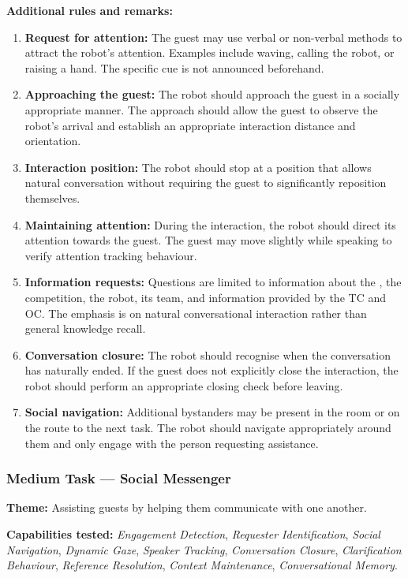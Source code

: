 \medskip
\noindent \textbf{Additional rules and remarks:}
\begin{enumerate}[nosep]
	\item \textbf{Request for attention:} The guest may use verbal or non-verbal methods to attract the robot's attention. Examples include waving, calling the robot, or raising a hand. The specific cue is not announced beforehand.
	\item \textbf{Approaching the guest:} The robot should approach the guest in a socially appropriate manner. The approach should allow the guest to observe the robot's arrival and establish an appropriate interaction distance and orientation.
	\item \textbf{Interaction position:} The robot should stop at a position that allows natural conversation without requiring the guest to significantly reposition themselves.
	\item \textbf{Maintaining attention:} During the interaction, the robot should direct its attention towards the guest. The guest may move slightly while speaking to verify attention tracking behaviour.
	\item \textbf{Information requests:} Questions are limited to information about the \Arena{}, the competition, the robot, its team, and information provided by the TC and OC. The emphasis is on natural conversational interaction rather than general knowledge recall.
	\item \textbf{Conversation closure:} The robot should recognise when the conversation has naturally ended. If the guest does not explicitly close the interaction, the robot should perform an appropriate closing check before leaving.
	\item \textbf{Social navigation:} Additional bystanders may be present in the room or on the route to the next task. The robot should navigate appropriately around them and only engage with the person requesting assistance.
\end{enumerate}

\subsubsection*{Medium Task --- Social Messenger}

\noindent \textbf{Theme:}
Assisting guests by helping them communicate with one another.

\medskip
\noindent \textbf{Capabilities tested:}
\emph{Engagement Detection}, \emph{Requester Identification}, \emph{Social Navigation}, \emph{Dynamic Gaze}, \emph{Speaker Tracking}, \emph{Conversation Closure}, \emph{Clarification Behaviour}, \emph{Reference Resolution}, \emph{Context Maintenance}, \emph{Conversational Memory}.

